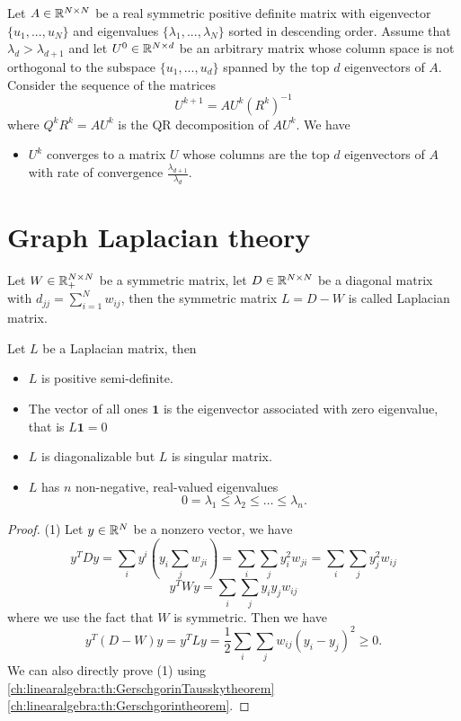\begin{refsection}
\begin{theorem}\cite[115]{ma2002generalized}\cite[454]{golub2013matrix}
	Let $A\in \mathbb{R}^{N\times N}$ be a real symmetric positive definite matrix with eigenvector $\{u_1,...,u_N\}$ and eigenvalues $\{\lambda_1,...,\lambda_N\}$ sorted in descending order. Assume that $\lambda_d > \lambda_{d+1}$ and let $U^0\in \mathbb{R}^{N\times d}$ be an arbitrary matrix whose column space is not orthogonal to the subspace $\{u_1,...,u_d\}$ spanned by the top $d$ eigenvectors of $A$. Consider the sequence of the matrices
	$$U^{k+1} = AU^k(R^k)^{-1}$$
	where $Q^kR^k = AU^k$ is the QR decomposition of $AU^k$.
	We have 
	\begin{itemize}
		\item  $U^k$ converges to a matrix $U$ whose columns are the top $d$ eigenvectors of $A$ with rate of convergence $\frac{\lambda_{d+1}}{\lambda_d}$.
	\end{itemize}	
\end{theorem}



\section{Graph Laplacian theory}
\begin{definition}\label{ch:linearalgebra:def:graphLaplacian}
	Let $W\in \mathbb{R}^{N\times N}_+$ be a symmetric matrix, let $D\in \mathbb{R}^{N\times N}$ be a diagonal matrix with $d_{jj}=\sum_{i=1}^N w_{ij}$, then the symmetric matrix $L=D-W$ is called Laplacian matrix.
\end{definition}

\begin{theorem}\label{ch:linearalgebra:def:spectrumgraphLaplacian}
	\cite[140]{vidal2016generalized}\cite{von2007tutorial}Let $L$ be a Laplacian matrix, then
	\begin{itemize}
		\item $L$ is positive semi-definite.
		\item The vector of all ones $\bm{1}$ is the eigenvector associated with zero eigenvalue, that is $L\bm{1} = 0$
		\item $L$ is diagonalizable but $L$ is singular matrix.
		\item $L$ has $n$ non-negative, real-valued eigenvalues $$0 = \lambda_1 \leq \lambda_2 \leq \dots \leq \lambda_n.$$
	\end{itemize}
\end{theorem}
\begin{proof}
	(1) Let $y\in \mathbb{R}^N$ be a nonzero vector, we have
	$$y^TDy = \sum_{i}y^i(y_i\sum_j w_{ji})=\sum_{i}\sum_{j}y^2_i w_{ji} = \sum_{i}\sum_{j}y^2_j w_{ij}$$
	$$y^TWy=\sum_{i}\sum_{j}y_iy_j w_{ij}$$
	where we use the fact that $W$ is symmetric. Then we have
	$$y^T(D-W)y=y^TLy = \frac{1}{2}\sum_{i}\sum_{j}w_{ij}(y_i-y_j)^2 \geq 0.$$
	We can also directly prove (1) using \autoref{ch:linearalgebra:th:GerschgorinTausskytheorem}\autoref{ch:linearalgebra:th:Gerschgorintheorem}.
	

\end{proof}
\end{refsection}
